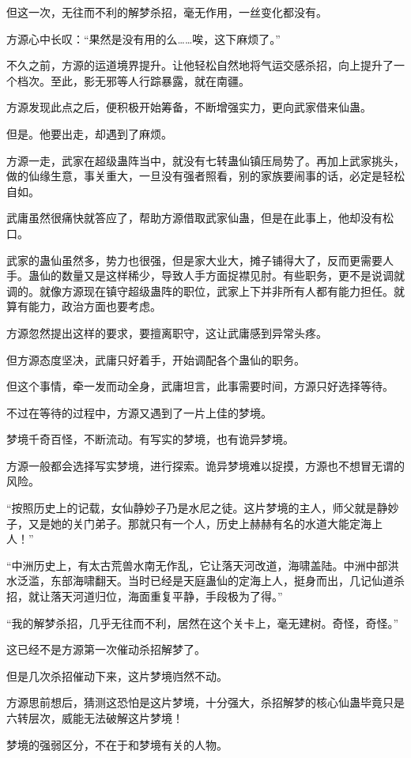 \begin{this_body}
但这一次，无往而不利的解梦杀招，毫无作用，一丝变化都没有。

方源心中长叹：“果然是没有用的么……唉，这下麻烦了。”

不久之前，方源的运道境界提升。让他轻松自然地将气运交感杀招，向上提升了一个档次。至此，影无邪等人行踪暴露，就在南疆。

方源发现此点之后，便积极开始筹备，不断增强实力，更向武家借来仙蛊。

但是。他要出走，却遇到了麻烦。

方源一走，武家在超级蛊阵当中，就没有七转蛊仙镇压局势了。再加上武家挑头，做的仙缘生意，事关重大，一旦没有强者照看，别的家族要闹事的话，必定是轻松自如。

武庸虽然很痛快就答应了，帮助方源借取武家仙蛊，但是在此事上，他却没有松口。

武家的蛊仙虽然多，势力也很强，但是家大业大，摊子铺得大了，反而更需要人手。蛊仙的数量又是这样稀少，导致人手方面捉襟见肘。有些职务，更不是说调就调的。就像方源现在镇守超级蛊阵的职位，武家上下并非所有人都有能力担任。就算有能力，政治方面也要考虑。

方源忽然提出这样的要求，要擅离职守，这让武庸感到异常头疼。

但方源态度坚决，武庸只好着手，开始调配各个蛊仙的职务。

但这个事情，牵一发而动全身，武庸坦言，此事需要时间，方源只好选择等待。

不过在等待的过程中，方源又遇到了一片上佳的梦境。

梦境千奇百怪，不断流动。有写实的梦境，也有诡异梦境。

方源一般都会选择写实梦境，进行探索。诡异梦境难以捉摸，方源也不想冒无谓的风险。

“按照历史上的记载，女仙静妙子乃是水尼之徒。这片梦境的主人，师父就是静妙子，又是她的关门弟子。那就只有一个人，历史上赫赫有名的水道大能定海上人！”

“中洲历史上，有太古荒兽水南无作乱，它让落天河改道，海啸盖陆。中洲中部洪水泛滥，东部海啸翻天。当时已经是天庭蛊仙的定海上人，挺身而出，几记仙道杀招，就让落天河道归位，海面重复平静，手段极为了得。”

“我的解梦杀招，几乎无往而不利，居然在这个关卡上，毫无建树。奇怪，奇怪。”

这已经不是方源第一次催动杀招解梦了。

但是几次杀招催动下来，这片梦境岿然不动。

方源思前想后，猜测这恐怕是这片梦境，十分强大，杀招解梦的核心仙蛊毕竟只是六转层次，威能无法破解这片梦境！

梦境的强弱区分，不在于和梦境有关的人物。


\end{this_body}
